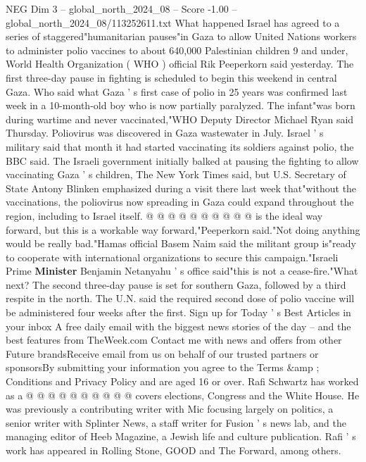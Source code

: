 \begin{textsample}{NEG Dim 3 – global\_north\_2024\_08 – Score -1.00 – global\_north\_2024\_08/113252611.txt}  \label{ex:f3_neg_322}
What happened Israel has agreed to a series of staggered"humanitarian pauses"in Gaza to allow United Nations workers to administer polio vaccines to about 640,000 Palestinian children 9 and under, World Health Organization ( WHO ) official Rik Peeperkorn said yesterday.
The first three-day pause in fighting is scheduled to begin this weekend in central Gaza.
Who said what Gaza ' s first case of polio in 25 years was confirmed last week in a 10-month-old boy who is now partially paralyzed.
The infant"was born during wartime and never vaccinated,"WHO Deputy Director Michael Ryan said Thursday.
Poliovirus was discovered in Gaza wastewater in July.
Israel ' s military said that month it had started vaccinating its soldiers against polio, the BBC said.
The Israeli government initially balked at pausing the fighting to allow vaccinating Gaza ' s children, The New York Times said, but U.S.
Secretary of State Antony Blinken emphasized during a visit there last week that"without the vaccinations, the poliovirus now spreading in Gaza could expand throughout the region, including to Israel itself. @ @ @ @ @ @ @ @ @ @ is the ideal way forward, but this is a workable way forward,"Peeperkorn said."Not doing anything would be really bad."Hamas official Basem Naim said the militant group is"ready to cooperate with international organizations to secure this campaign."Israeli Prime \textbf{Minister} Benjamin Netanyahu ' s office said"this is not a cease-fire."What next?
The second three-day pause is set for southern Gaza, followed by a third respite in the north.
The U.N. said the required second dose of polio vaccine will be administered four weeks after the first.
Sign up for Today ' s Best Articles in your inbox A free daily email with the biggest news stories of the day -- and the best features from TheWeek.com Contact me with news and offers from other Future brandsReceive email from us on behalf of our trusted partners or sponsorsBy submitting your information you agree to the Terms \&amp ; Conditions and Privacy Policy and are aged 16 or over.
Rafi Schwartz has worked as a @ @ @ @ @ @ @ @ @ @ covers elections, Congress and the White House.
He was previously a contributing writer with Mic focusing largely on politics, a senior writer with Splinter News, a staff writer for Fusion ' s news lab, and the managing editor of Heeb Magazine, a Jewish life and culture publication.
Rafi ' s work has appeared in Rolling Stone, GOOD and The Forward, among others.

\end{textsample}

